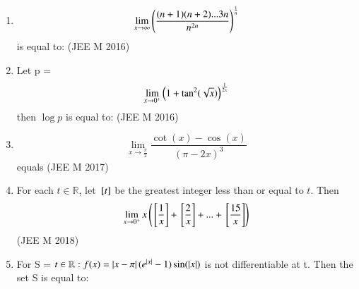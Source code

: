 \documentclass[journal,12pt,twocolumn]{IEEEtran}
\theoremstyle{remark}
\begin{document}
\begin{enumerate}
\item \[\lim_{x\to\infty} \left(\frac{(n+1)(n+2)...3n}{n^{2n}}\right)^{\frac{1}{n}} \] is equal to:
	\hfill{(JEE M 2016)}
	\begin{enumerate}[label=(\alph*)]
	\end{enumerate}
\item Let p = \[\lim_{x\to0^+} \left(1+\tan^2(\sqrt{x})\right)^{\frac{1}{2x}} \] then $\log p$ is equal to:
	\hfill{(JEE M 2016)}
	\begin{enumerate}[label=(\alph*)]
	\end{enumerate}
\item \[\lim_{x\to\frac{\pi}{2}} \frac{\cot(x)-\cos(x)}{(\pi -2x)^3} \] equals 
	\hfill{(JEE M 2017)}
	\begin{enumerate}[label=(\alph*)]
	\end{enumerate}
\item For each $t\in\mathbb{R}$, let ${}\left[t\right]$ be the greatest integer less than or equal to $t$. Then 
	\[\lim_{x\to0^+} x\left( {}\left[\frac{1}{x}\right]+{}\left[\frac{2}{x}\right]+...+{}\left[ \frac{15}{x}\right]\right) \]
	\hfill{(JEE M 2018)}
	\begin{enumerate}[label=(\alph*)]
	\end{enumerate}
\item For S =  $t\in\mathbb{R}:f(x)=\left\vert x-\pi\right\vert(e^{\left\vert x\right\vert}-1)\sin(\left\vert x\right\vert)$ is not differentiable at t. Then the set S is equal to:


\end{enumerate}
\end{document}
